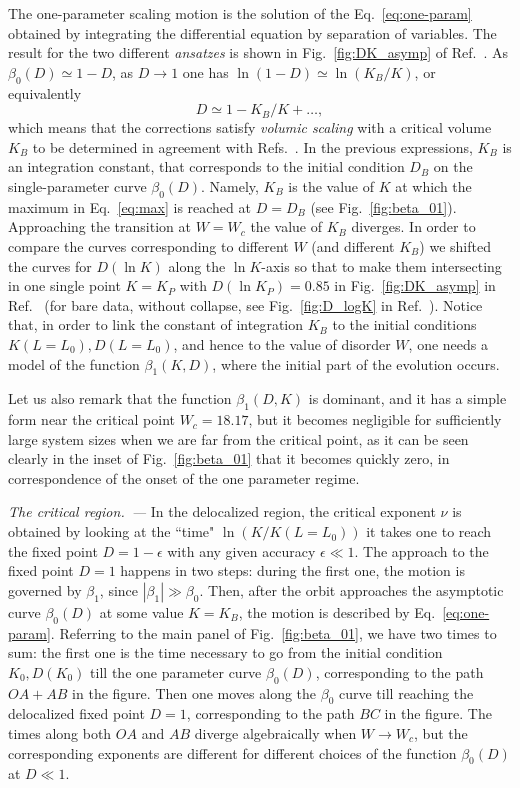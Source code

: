 \documentclass[reprint,aps,prl,superscriptaddress,english,nolongbibliography]{revtex4-2}
\begin{document}
{The one-parameter scaling motion is the solution of the Eq.~\eqref{eq:one-param} obtained by integrating the differential equation by separation of variables. The result for the two different {\it ansatzes} is shown in Fig.~\ref{fig:DK_asymp} of Ref.~\cite{SupplMat}. 
As $\beta_0(D)\simeq 1-D$, as $D\to 1$ one has $\ln(1-D)\simeq\ln(K_B/K)$, or equivalently 
\begin{equation}
\label{eq:D_K0}
    D\simeq 1- K_B/K +\dots, 
\end{equation}    
which means that the corrections satisfy {\it volumic scaling} with a critical volume $K_B$ to be determined in agreement with Refs.~\cite{zirnbauer1986localization,mirlin1991localization}. In the previous expressions, $K_B$ is an integration constant, that corresponds to the initial condition $D_B$ on the single-parameter curve $\beta_0(D)$. Namely, $K_B$ is the value of $K$ at which the maximum in Eq.~\eqref{eq:max} is reached at $D=D_B$ (see Fig.~\ref{fig:beta_01}). Approaching the transition at $W=W_c$ the value of $K_B$ diverges. In order to compare the curves corresponding to different $W$ (and different $K_B$) we shifted the curves for $D(\ln K)$ along the $\ln K$-axis so that to make them intersecting in one single point $K=K_{P}$ with $D(\ln K_{P})=0.85$ in Fig.~\ref{fig:DK_asymp} in Ref.~\cite{SupplMat} (for bare data, without collapse, see Fig.~\ref{fig:D_logK} in Ref.~\cite{SupplMat}).
Notice that, in order to link the constant of integration $K_B$ to the initial conditions $K(L=L_0),D(L=L_0)$, and hence to the value of disorder $W$, one needs a model of the function $\beta_1(K,D)$, where the initial part of the evolution occurs.

Let us also remark that the function $\beta_1(D,K)$ is dominant, and it has a simple form near the critical point $W_c=18.17$, but it becomes negligible for sufficiently large system sizes when we are far from the critical point, as it can be seen clearly in the inset of Fig.~\ref{fig:beta_01} that it becomes quickly zero, in correspondence of the onset of the one parameter regime. 

\emph{The critical region.~---}  In the delocalized region, the critical exponent $\nu$ is obtained by looking at the ``time" $\ln(K/K(L=L_{0}))$ it takes one to reach the fixed point $D=1-\epsilon$ with any given accuracy $\epsilon\ll 1$. The approach to the fixed point $D=1$ happens in two steps: during the first one, the motion is governed by $\beta_1$, since $|\beta_1| \gg \beta_0$. Then, after the orbit approaches the asymptotic curve $\beta_0(D)$ at some value $K=K_B$, the motion is described by Eq.~\eqref{eq:one-param}. 
Referring to the main panel of Fig.~\ref{fig:beta_01}, we have two times to sum: the first one is the time necessary to go from the initial condition $K_0, D(K_0)$ till the one parameter curve $\beta_0(D)$, corresponding to the path $OA + AB$ in the figure. Then one moves along the $\beta_0$ curve till reaching the delocalized fixed point $D=1$, corresponding to the path $BC$ in the figure. The times along both $OA$ and $AB$ diverge algebraically when $W\to W_c$, but the corresponding exponents are different for different choices of the function $\beta_{0}(D)$ at $D\ll 1$.

}
\end{document}

